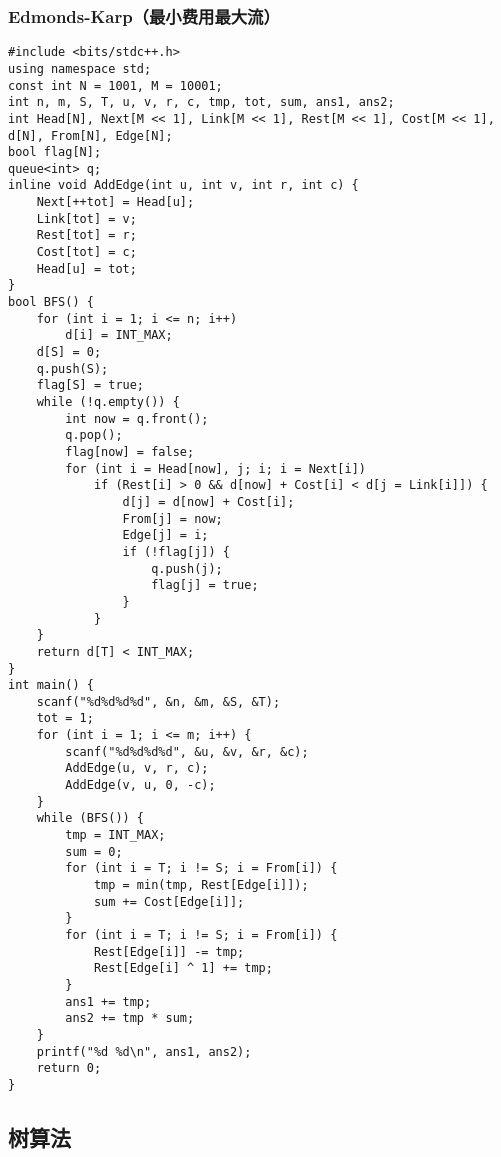 \documentclass[a4paper]{article}
\begin{document}
\subsubsection{Edmonds-Karp（最小费用最大流）}
\begin{lstlisting}
#include <bits/stdc++.h>
using namespace std;
const int N = 1001, M = 10001;
int n, m, S, T, u, v, r, c, tmp, tot, sum, ans1, ans2;
int Head[N], Next[M << 1], Link[M << 1], Rest[M << 1], Cost[M << 1], d[N], From[N], Edge[N];
bool flag[N];
queue<int> q;
inline void AddEdge(int u, int v, int r, int c) {
    Next[++tot] = Head[u];
    Link[tot] = v;
    Rest[tot] = r;
    Cost[tot] = c;
    Head[u] = tot;
}
bool BFS() {
    for (int i = 1; i <= n; i++)
        d[i] = INT_MAX;
    d[S] = 0;
    q.push(S);
    flag[S] = true;
    while (!q.empty()) {
        int now = q.front();
        q.pop();
        flag[now] = false;
        for (int i = Head[now], j; i; i = Next[i])
            if (Rest[i] > 0 && d[now] + Cost[i] < d[j = Link[i]]) {
                d[j] = d[now] + Cost[i];
                From[j] = now;
                Edge[j] = i;
                if (!flag[j]) {
                    q.push(j);
                    flag[j] = true;
                }
            }
    }
    return d[T] < INT_MAX;
}
int main() {
    scanf("%d%d%d%d", &n, &m, &S, &T);
    tot = 1;
    for (int i = 1; i <= m; i++) {
        scanf("%d%d%d%d", &u, &v, &r, &c);
        AddEdge(u, v, r, c);
        AddEdge(v, u, 0, -c);
    }
    while (BFS()) {
        tmp = INT_MAX;
        sum = 0;
        for (int i = T; i != S; i = From[i]) {
            tmp = min(tmp, Rest[Edge[i]]);
            sum += Cost[Edge[i]];
        }
        for (int i = T; i != S; i = From[i]) {
            Rest[Edge[i]] -= tmp;
            Rest[Edge[i] ^ 1] += tmp;
        }
        ans1 += tmp;
        ans2 += tmp * sum;
    }
    printf("%d %d\n", ans1, ans2);
    return 0;
}
\end{lstlisting}
\subsection{树算法}
\end{document}
